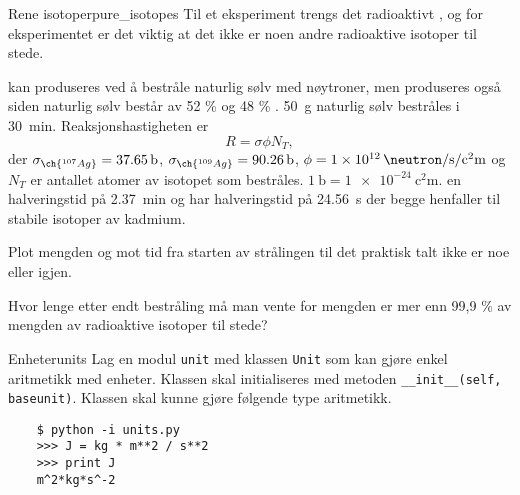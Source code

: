 \begin{exercise}{Rene isotoper}{pure_isotopes}
	Til et eksperiment trengs det radioaktivt , og for eksperimentet er det viktig at det ikke er noen andre radioaktive isotoper til stede. 
	
	 kan produseres ved å bestråle naturlig sølv med nøytroner, men  produseres også siden naturlig sølv består av 52 \%  og 48 \% . \SI{50}{\gram} naturlig sølv bestråles i \SI{30}{\minute}. Reaksjonshastigheten er 
	\begin{equation*}
	R=\sigma\phi N_T,
	\end{equation*}
	der $\sigma_{\ch{^{107}Ag}}=\SI{37,65}{\barn}$, $\sigma_{\ch{^{109}Ag}}=\SI{90,26}{\barn}$, $\phi=\SI{1e12}{\neutron\per\second\per\square\centi\meter}$ og $N_T$ er antallet atomer av isotopet som bestråles. $\SI{1}{\barn}=\SI{1e-24}{\square\centi\meter}$.  en halveringstid på \SI{2,37}{\minute} og  har halveringstid på \SI{24,56}{\second} der begge henfaller til stabile isotoper av kadmium. 
		
	\subexercise Plot mengden  og  mot tid fra starten av strålingen til det praktisk talt ikke er noe  eller  igjen.
	
	\subexercise Hvor lenge etter endt bestråling må man vente for mengden  er mer enn 99,9 \% av mengden av radioaktive isotoper til stede?
\end{exercise}

\exercisechapter

\begin{exercise}{Enheter}{units}
	Lag en modul \texttt{unit} med klassen \texttt{Unit} som kan gjøre enkel aritmetikk med enheter. Klassen skal initialiseres med metoden \texttt{__init__(self, baseunit)}. Klassen skal kunne gjøre følgende type aritmetikk.\\
	
	\begin{verbatim}
	$ python -i units.py
	>>> J = kg * m**2 / s**2
	>>> print J
	m^2*kg*s^-2
	\end{verbatim}
	\
\end{exercise}

